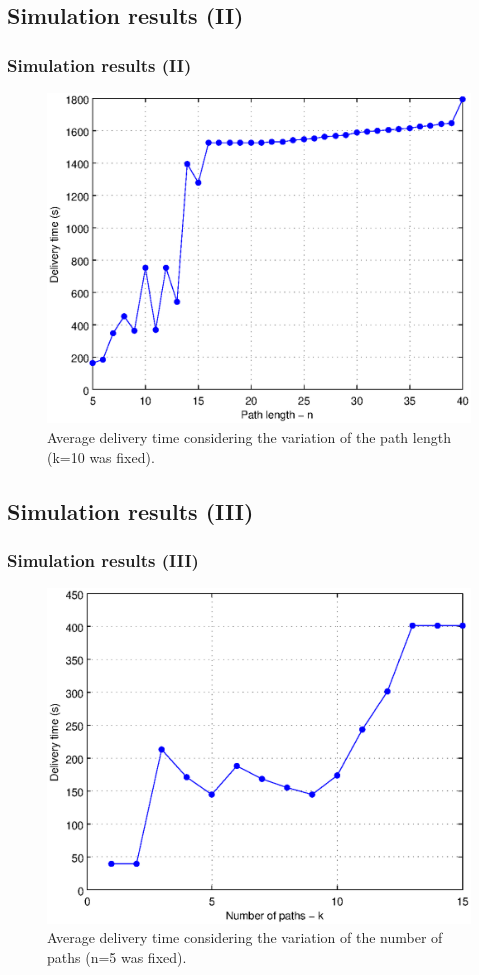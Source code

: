 \documentclass[compress,red]{beamer}
\begin{document}
\subsection{Simulation results (II)}
\begin{frame}
\frametitle{Simulation results (II)}
\begin{figure}
\centering \includegraphics[width=.7\linewidth]{../paper/imgs/statistics/ntime-data}
\caption{Average delivery time considering the variation of the path length (k=10 was fixed).}
\end{figure}
\end{frame}

\subsection{Simulation results (III)}
\begin{frame}
\frametitle{Simulation results (III)}
\begin{figure}
\centering \includegraphics[width=.7\linewidth]{../paper/imgs/statistics/ktime-data}
\caption{Average delivery time considering the variation of the number of paths (n=5 was fixed).}
\end{figure}
\end{frame}
\end{document}
